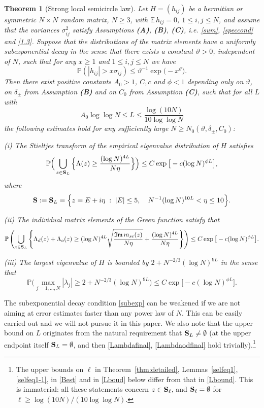 \documentclass[draft]{article}
\newcommand{\ttau}{\vartheta}
\newcommand{\be}{\begin{equation}}
\newcommand{\ee}{\end{equation}}
\newcommand{\im}{{\mathfrak{Im} \, }}
\newcommand{\E}{{\mathbb E }}
\renewcommand{\P}{{\mathbb P}}
\newcommand{\bS}{ {\bf  S}}
\newtheorem{theorem}{Theorem}
\numberwithin{equation}{section}
\numberwithin{theorem}{section}
\numberwithin{definition}{section}
\numberwithin{remark}{section}
\begin{document}
\begin{theorem}[Strong local semicircle law] \label{45-1} 
Let $H=(h_{ij})$ be a hermitian or symmetric $N\times N$ random matrix, $N\ge 3$,
with $\E\, h_{ij}=0$, $1\leq i,j\leq N$,  and assume that the variances $\sigma_{ij}^2$ 
satisfy Assumptions {\bf (A)}, {\bf (B)}, {\bf (C)}, i.e. \eqref{sum}, \eqref{speccond} and 
 \eqref{1.3}. 
 Suppose that the distributions of the matrix elements have a uniformly 
  subexponential decay
in the sense that  there exists a constant  $\ttau>0$, independent 
of $N$, such that for any $x\ge 1$ and $1\le i,j \le N$ we have
\be\label{subexp}
\P(|h_{ij}|> x \sigma_{ij})\le \ttau^{-1} \exp{ \big( - x^\ttau \big)} .
\ee
 Then  there exist positive constants   $A_0 > 1$,  $ C, c$ and $\phi < 1$  
depending only on $\ttau$, on $\delta_\pm$ from Assumption {\bf (B)} and
on $C_0$ from Assumption {\bf (C)}, such that
 for all  $L$ with 
\be
A_0\log\log N\le L\le \frac{\log (10 N)}{10\log\log N}
\label{Lbound}
\ee
 the following estimates hold for any sufficiently large $N\ge N_0(\ttau, \delta_\pm, C_0)$:

(i) The Stieltjes transform of the empirical 
eigenvalue distribution of  $H $  satisfies 
\be\label{Lambdafinal} 
\P \Big ( \bigcup_{z\in \bS_L} \Big\{ \Lambda(z) 
 \ge \frac{(\log N)^{4L}}{N\eta} \Big\}   \Big )\le  C\exp{\big[-c(\log N)^{\phi L} \big]}, 
\ee
where
\be
{\bf  S}:={\bf  S}_L=\Big\{ z=E+i\eta\; : \;
 |E|\leq 5,  \quad  N^{-1}(\log N)^{10L} < \eta \le  10  \Big\}.
\label{defS}
\ee

(ii) The individual  matrix elements of
the Green function  satisfy that 
\be\label{Lambdaodfinal}
\P \left  ( \bigcup_{z\in \bS_L} \left\{ \Lambda_d(z)  + \Lambda_o (z) \geq 
(\log N)^{4L} \sqrt{\frac{\im m_{sc}(z)  }{N\eta}} + \frac{(\log N)^{4L}}{N\eta}
   \right\}    \right)
\leq  C\exp{\big[-c(\log N)^{\phi L} \big]}.
\ee

(iii)  The largest eigenvalue of $H$ is bounded by $2+N^{-2/3}(\log N)^{ 9L} $ in the sense that 
\be\label{443}
\P \Big (  \max_{j=1, \ldots, N} |\lambda_j  |\ge 2+N^{-2/3}(\log N)^{ 9 L} 
  \Big) 
  \le   C\exp{\big[-c(\log N)^{{\phi L}  } \big]}.  
\ee



\end{theorem}


The subexponential decay condition \eqref{subexp} can be
 weakened  if we are not aiming 
at error estimates faster than any power law of $N$. 
This can be easily carried out and we will not pursue  it in this paper. 
We also note that the upper bound on $L$ originates from the natural requirement that
$\bS_L\neq\emptyset$ (at the upper endpoint itself $\bS_L=\emptyset$, and then \eqref{Lambdafinal},
\eqref{Lambdaodfinal} hold trivially).\footnote{The upper bounds on $\ell$ in
Theorem~\ref{thm:detailed}, Lemmas~\ref{selfeq1}, \ref{selfeq1-1}, in \eqref{Best} and in \eqref{Lboud}
below differ from that in \eqref{Lbound}. This is immaterial: all these statements concern
$z\in\bS_\ell$, and $\bS_\ell=\emptyset$ for $\ell\ge \log(10N)/(10\log\log N)$.}
\medskip
\end{document}
